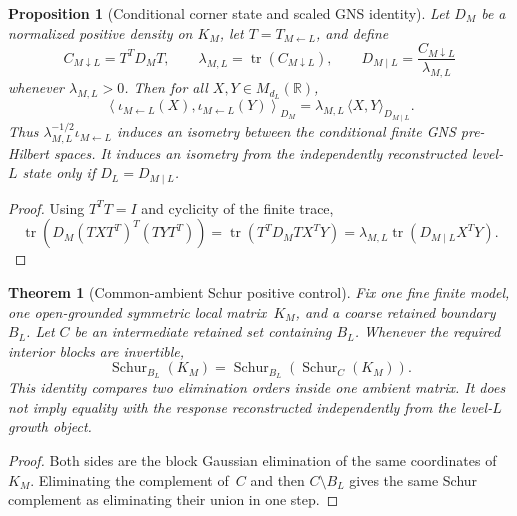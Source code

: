 \documentclass[11pt]{article}
\newtheorem{theorem}[definition]{Theorem}
\newtheorem{proposition}[definition]{Proposition}
\theoremstyle{remark}
\newcommand{\R}{\mathbb{R}}
\numberwithin{equation}{section}
\begin{document}
\begin{proposition}[Conditional corner state and scaled GNS identity]\label{prop:conditional-corner-state-gns}
Let \(D_M\) be a normalized positive density on \(K_M\), let \(T=T_{M\leftarrow L}\), and define
\begin{equation}
 C_{M\downarrow L}=T^TD_MT,
 \qquad
 \lambda_{M,L}=\operatorname{tr}(C_{M\downarrow L}),
 \qquad
 D_{M\mid L}=\frac{C_{M\downarrow L}}{\lambda_{M,L}}
 \label{eq:conditional-corner-density}
\end{equation}
whenever \(\lambda_{M,L}>0\).  Then for all \(X,Y\in M_{d_L}(\R)\),
\begin{equation}
 \left\langle\iota_{M\leftarrow L}(X),
                  \iota_{M\leftarrow L}(Y)\right\rangle_{D_M}
 =
 \lambda_{M,L}\,\langle X,Y\rangle_{D_{M\mid L}}.
 \label{eq:scaled-corner-gns-isometry}
\end{equation}
Thus \(\lambda_{M,L}^{-1/2}\iota_{M\leftarrow L}\) induces an isometry between the conditional finite GNS pre-Hilbert spaces.  It induces an isometry from the independently reconstructed level-\(L\) state only if \(D_L=D_{M\mid L}\).
\end{proposition}

\begin{proof}
Using \(T^TT=I\) and cyclicity of the finite trace,
\[
 \operatorname{tr}\!\left(D_M(TXT^T)^T(TYT^T)\right)
 =\operatorname{tr}\!\left(T^TD_MT X^TY\right)
 =\lambda_{M,L}\operatorname{tr}\!\left(D_{M\mid L}X^TY\right).
\]
\end{proof}

\begin{theorem}[Common-ambient Schur positive control]\label{thm:common-ambient-interlevel-schur}
Fix one fine finite model, one open-grounded symmetric local matrix~\(K_M\), and a coarse retained boundary~\(B_L\).  Let \(C\) be an intermediate retained set containing \(B_L\).  Whenever the required interior blocks are invertible,
\begin{equation}
 \operatorname{Schur}_{B_L}(K_M)
 =
 \operatorname{Schur}_{B_L}\!\left(
   \operatorname{Schur}_{C}(K_M)
 \right).
 \label{eq:common-ambient-schur-associativity}
\end{equation}
This identity compares two elimination orders inside one ambient matrix.  It does not imply equality with the response reconstructed independently from the level-\(L\) growth object.
\end{theorem}

\begin{proof}
Both sides are the block Gaussian elimination of the same coordinates of~\(K_M\).  Eliminating the complement of~\(C\) and then \(C\setminus B_L\) gives the same Schur complement as eliminating their union in one step.
\end{proof}
\end{document}
